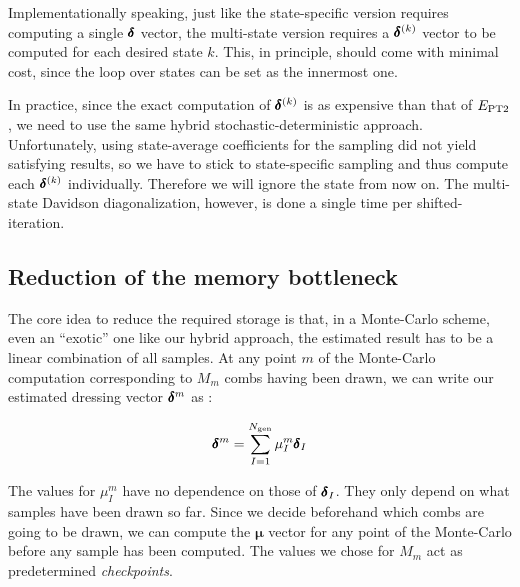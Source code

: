 \documentclass[./thesis.tex]{subfiles}
\begin{document}
Implementationally speaking, just like the state-specific version requires computing a single $\pmb \delta$ vector, the multi-state version requires a $\pmb \delta^{(k)}$ vector to be computed for each desired state $k$. This, in principle, should come with minimal cost, since the loop over states can be set as the innermost one. 

In practice, since the exact computation of $\pmb \delta^{(k)}$ is as expensive than that of $E_\text{PT2}$, we need to use the same hybrid stochastic-deterministic approach. Unfortunately, using state-average coefficients for the sampling did not yield satisfying results, so we have to stick to state-specific sampling and thus compute each $\pmb \delta^{(k)}$ individually. Therefore we will ignore the state from now on.
The multi-state Davidson diagonalization, however, is done a single time per shifted-\Bk iteration.

\subsection{Reduction of the memory bottleneck}

The core idea to reduce the required storage is that, in a Monte-Carlo scheme, even an ``exotic'' one like our hybrid approach, the estimated result has to be a linear combination of all samples. At any point $m$ of the Monte-Carlo computation corresponding to $M_m$ combs having been drawn, we can write our estimated dressing vector $\pmb \delta^m$ as :


\begin{equation}
\pmb \delta^m = \sum_{I=1}^{{N_\text{gen}}} \mu^m_{I} \pmb \delta_I
\end{equation}


The values for $\mu^m_I$ have no dependence on those of $\pmb \delta_I$. They only depend on what samples have been drawn so far. Since we decide beforehand which combs are going to be drawn, we can compute the ${\pmb \mu}$ vector for any point of the Monte-Carlo before any sample has been computed. The values we chose for $M_m$ act as predetermined \emph{checkpoints}.

\end{document}
